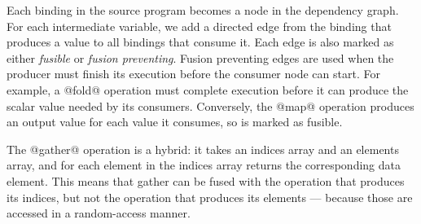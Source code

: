 Each binding in the source program becomes a node in the dependency graph. For each intermediate variable, we add a directed edge from the binding that produces a value to all bindings that consume it. Each edge is also marked as either \emph{fusible} or \emph{fusion preventing}. Fusion preventing edges are used when the producer must finish its execution before the consumer node can start. For example, a @fold@ operation must complete execution before it can produce the scalar value needed by its consumers. Conversely, the @map@ operation produces an output value for each value it consumes, so is marked as fusible. 

The @gather@ operation is a hybrid: it takes an indices array and an elements array, and for each element in the indices array returns the corresponding data element. This means that gather can be fused with the operation that produces its indices, but not the operation that produces its elements --- because those are accessed in a random-access manner. 


